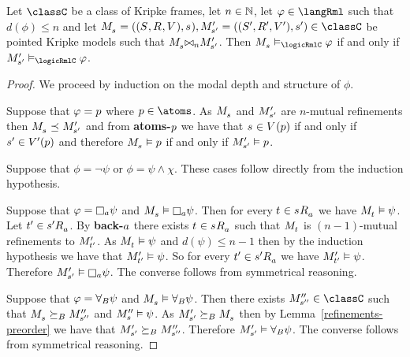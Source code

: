 \begin{lemma}
Let $\classC$ be a class of Kripke frames,
let $n \in \mathbb{N}$,
let $\phi \in \langRml$ such that $d(\phi) \leq n$
and let $\kPModelAndTuple{\kStateS}, \kPModelAndTupleP{\kStateSP} \in \classC$ be pointed Kripke models
such that $\kPModel{\kStateS} \bisimref[n] \kPModelP{\kStateSP}$.
Then $\kPModel{\kStateS} \entails_\logicRmlC \phi$ if and only if $\kPModelP{\kStateSP} \entails_\logicRmlC \phi$.
\end{lemma}

\begin{proof}
We proceed by induction on the modal depth and structure of $\phi$.

Suppose that $\varphi = p$ where $\atomP \in \atoms$. 
As $\kPModel{\kStateS}$ and ${M^{\prime}_{{s}^{\prime}}}$ are $n$-mutual refinements then $\kPModel{\kStateS} \refines \kPModelP{\kStateSP}$ and from {\bf atoms-$p$} we have that $\kStateS \in \kValuation(\atomP)$ if and only if ${s}^{\prime} \in {V^{\prime}}(p)$ and therefore $\kPModel{\kStateS} \entails \atomP$ if and only if ${M^{\prime}_{{s}^{\prime}}} \vDash p$.

Suppose that $\phi = \neg \psi$ or $\phi = \psi \land \chi$.
These cases follow directly from the induction hypothesis.

Suppose that $\phi = \necessaryA \psi$ and $\kPModel{\kStateS} \entails \necessaryA \psi$.
Then for every $\kStateT \in \kStateS \kAccessibility{\agentA}$ we have $\kPModel{\kStateT} \entails \psi$.
Let $\kStateTP \in \kStateSP \kAccessibility{\agentA}$.
By {\bf back-$a$} there exists $\kStateT \in \kStateS \kAccessibility{\agentA}$ such that $\kPModel{\kStateT}$ is $(n-1)$-mutual refinements to ${M^{\prime}_{{t}^{\prime}}}$.
As $\kPModel{\kStateT} \entails \psi$ and $d(\psi) \leq n - 1$ then by the induction hypothesis we have that ${M^{\prime}_{{t}^{\prime}}} \vDash \psi$.
So for every $\kStateTP \in \kSuccessorsA{\kStateSP}$ we have ${M^{\prime}_{{t}^{\prime}}} \vDash \psi$.
Therefore $\kPModelP{\kStateSP} \entails \necessaryA \psi$.
The converse follows from symmetrical reasoning.

Suppose that $\varphi = {\forall_{B}} \psi$ and $\kPModel{\kStateS} \entails \allrefsBs \psi$.
Then there exists $\kPModelPP{\kStateSPP} \in \classC$ such that $\kPModel{\kStateS} \simulatesBs \kPModelPP{\kStateSPP}$ and $\kPModelPP{\kStateS} \entails \psi$.
As $\kPModelP{\kStateSP} \simulatesBs \kPModel{\kStateS}$ then by Lemma~\ref{refinements-preorder} we have that ${M^{\prime}_{{s}^{\prime}}} \succeq_{B} {M^{\prime\prime}_{{s}^{\prime\prime}}}$.
Therefore ${M^{\prime}_{{s}^{\prime}}} \vDash {\forall_{B}} \psi$.
The converse follows from symmetrical reasoning.
\end{proof}

